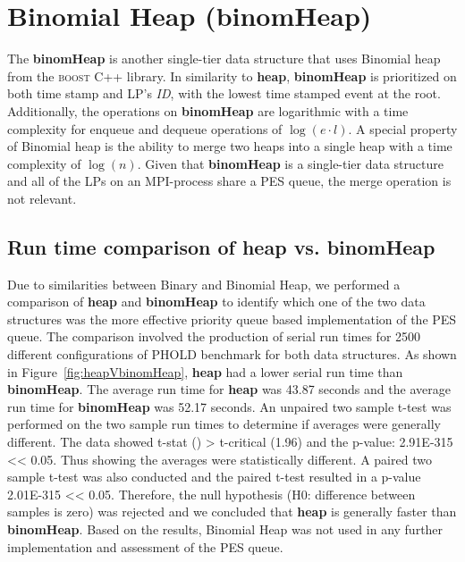 \section{Binomial Heap (binomHeap)} 
The \textbf{binomHeap} is another single-tier data structure that uses Binomial heap from the \textsc{boost} C++ library. In similarity to \textbf{heap}, \textbf{binomHeap} is prioritized on both time stamp and LP's \emph{ID}, with the lowest time stamped event at the root. Additionally, the operations on \textbf{binomHeap} are logarithmic with a time complexity for enqueue and dequeue operations of $\log(e\cdot l)$. A special property of Binomial heap is the ability to merge two heaps into a single heap with a time complexity of $\log(n)$. Given that \textbf{binomHeap} is a single-tier data structure and all of the LPs on an MPI-process share a PES queue, the merge operation is not relevant.

\subsection{Run time comparison of heap vs. binomHeap}
Due to similarities between Binary and Binomial Heap, we performed a comparison of \textbf{heap} and \textbf{binomHeap} to identify which one of the two data structures was the more effective priority queue based implementation of the PES queue. The comparison involved the production of serial run times for 2500 different configurations of PHOLD benchmark for both data structures. As shown in Figure~\ref{fig:heapVbinomHeap}, \textbf{heap} had a lower serial run time than \textbf{binomHeap}. The average run time for \textbf{heap} was 43.87 seconds and the average run time for \textbf{binomHeap} was 52.17 seconds. An unpaired two sample t-test was performed on the two sample run times to determine if averages were generally different. The data showed t-stat () > t-critical (1.96) and the p-value: 2.91E-315 << 0.05. Thus showing the averages were statistically different. A paired two sample t-test was also conducted and the paired t-test resulted in a p-value 2.01E-315
<< 0.05. Therefore, the null hypothesis (H0: difference between samples is zero) was rejected and we concluded that \textbf{heap} is generally faster than \textbf{binomHeap}. Based on the results, Binomial Heap was not used in any further implementation and assessment of the PES queue. 

